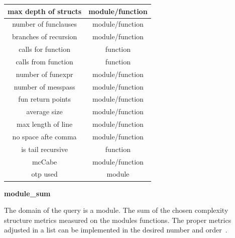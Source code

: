 \begin{table}[!htb]
{\begin{tabular}{|c|c|}
		  	\hline
		  	max depth of structs		& module/function		  			  
		  	\\		  			

		  	\hline
		  	number of funclauses		& module/function		  			  
		  	\\			
	
		  	\hline
		  	branches of recursion		& module/function		  			  
		  	\\			

		  	\hline
		  	calls for function			& function		  			  
		  	\\			
			
		  	\hline
		  	calls from function			& function		  			  
		  	\\	

		  	\hline
		  	number of funexpr			& module/function		  			  
		  	\\
		  	
		  	\hline
		  	number of messpass			& module/function		  			  
		  	\\		  	

		  	\hline
		  	fun return points			& module/function		  			  
		  	\\	
		  	
		  	\hline
		  	average size				& module/function		  			  
		  	\\		  		  	

		  	\hline
		  	max length of line			& module/function		  			  
		  	\\
		  	
		  	\hline
		  	no space afte  comma		& module/function		  			  
		  	\\	
		  	
		  	\hline
		  	is tail recursive			& function		  			  
		  	\\		  	

		  	\hline
		  	mcCabe						& module/function		  			  
		  	\\	
		  			  	
		  	\hline
		  	otp used						& module		  			  
		  	\\			  	
		  	\hline		  		  			  				
		\end{tabular}}
	\end{table}

\textbf{module\_sum}

The domain of the query is a module. The sum of the chosen complexity structure metrics measured on the modules functions. The proper metrics adjusted in a list can be implemented in the desired number and order~\cite{refactorerl}.


